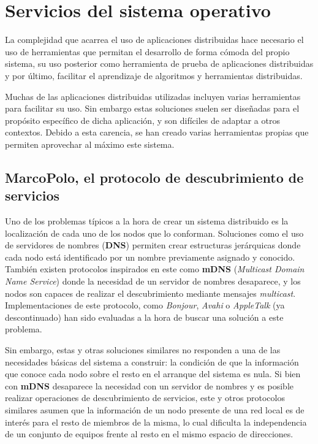 \chapter{Servicios del sistema operativo}

La complejidad que acarrea el uso de aplicaciones distribuidas hace necesario el uso de herramientas que permitan el desarrollo de forma cómoda del propio sistema, su uso posterior como herramienta de prueba de aplicaciones distribuidas y por último, facilitar el aprendizaje de algoritmos y herramientas distribuidas.

Muchas de las aplicaciones distribuidas utilizadas incluyen varias herramientas para facilitar su uso. Sin embargo estas soluciones suelen ser diseñadas para el propósito específico de dicha aplicación, y son difíciles de adaptar a otros contextos. Debido a esta carencia, se han creado varias herramientas propias que permiten aprovechar al máximo este sistema.

\section{MarcoPolo, el protocolo de descubrimiento de servicios}
\label{marcopolo}
Uno de los problemas típicos a la hora de crear un sistema distribuido es la localización de cada uno de los nodos que lo conforman. Soluciones como el uso de servidores de nombres (\textbf{DNS}) permiten crear estructuras jerárquicas donde cada nodo está identificado por un nombre previamente asignado y conocido. También existen protocolos inspirados en este como \textbf{mDNS} (\textit{Multicast Domain Name Service}) donde la necesidad de un servidor de nombres desaparece, y los nodos son capaces de realizar el descubrimiento mediante mensajes \textit{multicast}\cite{rfc6762}. Implementaciones de este protocolo, como \textit{Bonjour}, \textit{Avahi} o \textit{AppleTalk} (ya descontinuado) han sido evaluadas a la hora de buscar una solución a este problema.

Sin embargo, estas y otras soluciones similares no responden a una de las necesidades básicas del sistema a construir: la condición de que la información que conoce cada nodo sobre el resto en el arranque del sistema es nula. Si bien con \textbf{mDNS} desaparece la necesidad con un servidor de nombres y es posible realizar operaciones de descubrimiento de servicios, este y otros protocolos similares asumen que la información de un nodo presente de una red local es de interés para el resto de miembros de la misma, lo cual dificulta la independencia de un conjunto de equipos frente al resto en el mismo espacio de direcciones.

